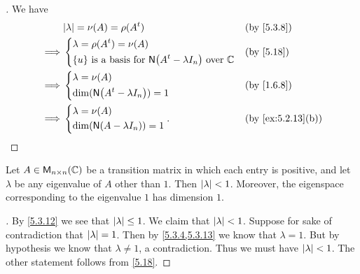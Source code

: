 \begin{proof}[]
  We have
  \begin{align*}
             & \abs{\lambda} = \nu(A) = \rho(\tp{A})                                                       &  & \text{(by \cref{5.3.8})} \\
    \implies & \begin{dcases}
                 \lambda = \rho(\tp{A}) = \nu(A) \\
                 \set{u} \text{ is a basis for } \ns{\tp{A} - \lambda I_n} \text{ over } \C
               \end{dcases} &  & \text{(by \cref{5.18})}                                \\
    \implies & \begin{dcases}
                 \lambda = \nu(A) \\
                 \dim(\ns{\tp{A} - \lambda I_n}) = 1
               \end{dcases}                          &  & \text{(by \cref{1.6.8})}                                                       \\
    \implies & \begin{dcases}
                 \lambda = \nu(A) \\
                 \dim(\ns{A - \lambda I_n}) = 1
               \end{dcases}.                                                              &  & \text{(by \cref{ex:5.2.13}(b))}
  \end{align*}
\end{proof}

\begin{cor}\label{5.3.14}
  Let \(A \in \mathsf{M}_{{n} \times n}({\mathbb{C}})\) be a transition matrix in which each entry is positive, and let \(\lambda\) be any eigenvalue of \(A\) other than \(1\).
  Then \(\left\lvert\lambda\right\rvert < 1\).
  Moreover, the eigenspace corresponding to the eigenvalue \(1\) has dimension \(1\).
\end{cor}

\begin{proof}[]
  By \cref{5.3.12} we see that \(\left\lvert\lambda\right\rvert \leq 1\).
  We claim that \(\left\lvert\lambda\right\rvert < 1\).
  Suppose for sake of contradiction that \(\left\lvert\lambda\right\rvert = 1\).
  Then by \cref{5.3.4,5.3.13} we know that \(\lambda = 1\).
  But by hypothesis we know that \(\lambda \neq 1\), a contradiction.
  Thus we must have \(\left\lvert\lambda\right\rvert < 1\).
  The other statement follows from \cref{5.18}.
\end{proof}

